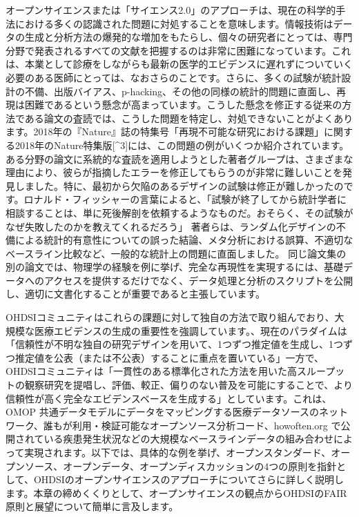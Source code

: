 \documentclass[
  11pt]{book}
\theoremstyle{definition}
\theoremstyle{definition}
\theoremstyle{definition}
\theoremstyle{definition}
\theoremstyle{remark}
\begin{document}
オープンサイエンスまたは「サイエンス2.0」のアプローチ\citep{wiki:Science_2.0}は、現在の科学的手法における多くの認識された問題に対処することを意味します。情報技術はデータの生成と分析方法の爆発的な増加をもたらし、個々の研究者にとっては、専門分野で発表されるすべての文献を把握するのは非常に困難になっています。これは、本業として診療をしながらも最新の医学的エビデンスに遅れずについていく必要のある医師にとっては、なおさらのことです。さらに、多くの試験が統計設計の不備、出版バイアス、p-hacking、その他の同様の統計的問題に直面し、再現は困難であるという懸念が高まっています。こうした懸念を修正する従来の方法である論文の査読では、こうした問題を特定し、対処できないことがよくあります。2018年の『Nature』誌の特集号「再現不可能な研究における課題」に関する2018年のNature特集版{[}\^{}3{]}には、この問題の例がいくつか紹介されています。ある分野の論文に系統的な査読を適用しようとした著者グループは、さまざまな理由により、彼らが指摘したエラーを修正してもらうのが非常に難しいことを発見しました。特に、最初から欠陥のあるデザインの試験は修正が難しかったのです。ロナルド・フィッシャーの言葉によると、「試験が終了してから統計学者に相談することは、単に死後解剖を依頼するようなものだ。おそらく、その試験がなぜ失敗したのかを教えてくれるだろう」\citep{wikiquote:Ronald_Fisher} 著者らは、ランダム化デザインの不備による統計的有意性についての誤った結論、メタ分析における誤算、不適切なベースライン比較など、一般的な統計上の問題に直面しました。\citep{allison_2016} 同じ論文集の別の論文では、物理学の経験を例に挙げ、完全な再現性を実現するには、基礎データへのアクセスを提供するだけでなく、データ処理と分析のスクリプトを公開し、適切に文書化することが重要であると主張しています。\citep{Chen2018}

OHDSIコミュニティはこれらの課題に対して独自の方法で取り組んでおり、大規模な医療エビデンスの生成の重要性を強調しています。\citet{schuemie_2018bによると}、現在のパラダイムは「信頼性が不明な独自の研究デザインを用いて、1つずつ推定値を生成し、1つずつ推定値を公表（または不公表）することに重点を置いている」一方で、OHDSIコミュニティは「一貫性のある標準化された方法を用いた高スループットの観察研究を提唱し、評価、較正、偏りのない普及を可能にすることで、より信頼性が高く完全なエビデンスベースを生成する」としています。これは、OMOP 共通データモデルにデータをマッピングする医療データソースのネットワーク、誰もが利用・検証可能なオープンソース分析コード、howoften.org で公開されている疾患発生状況などの大規模なベースラインデータの組み合わせによって実現されます。以下では、具体的な例を挙げ、オープンスタンダード、オープンソース、オープンデータ、オープンディスカッションの4つの原則を指針として、OHDSIのオープンサイエンスのアプローチについてさらに詳しく説明します。本章の締めくくりとして、オープンサイエンスの観点からOHDSIのFAIR原則と展望について簡単に言及します。
\end{document}
